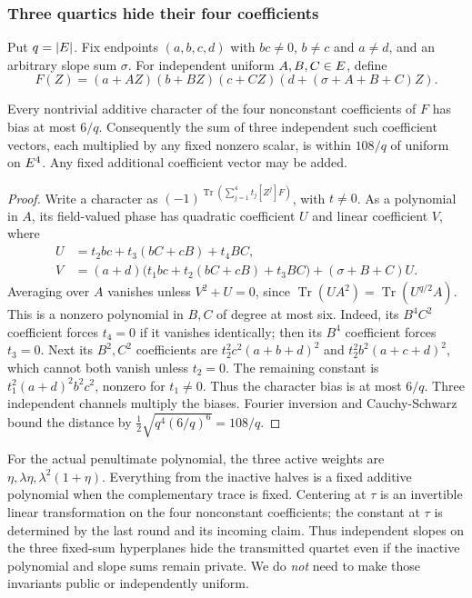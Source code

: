 \subsubsection{Three quartics hide their four coefficients}

Put $q=|E|$. Fix endpoints $(a,b,c,d)$ with $bc\ne0$, $b\ne c$ and $a\ne d$, and an arbitrary slope sum $\sigma$. For independent uniform $A,B,C\in E$, define
\[
 F(Z)=(a+AZ)(b+BZ)(c+CZ)(d+(\sigma+A+B+C)Z).
\]

\begin{lemma}
Every nontrivial additive character of the four nonconstant coefficients of $F$ has bias at most $6/q$. Consequently the sum of three independent such coefficient vectors, each multiplied by any fixed nonzero scalar, is within $108/q$ of uniform on $E^4$. Any fixed additional coefficient vector may be added.
\end{lemma}
\begin{proof}
Write a character as $(-1)^{\operatorname{Tr}(\sum_{j=1}^4t_j[Z^j]F)}$, with $t\ne0$. As a polynomial in $A$, its field-valued phase has quadratic coefficient $U$ and linear coefficient $V$, where
\[
\begin{aligned}
 U&=t_2bc+t_3(bC+cB)+t_4BC,\\
 V&=(a+d)\bigl(t_1bc+t_2(bC+cB)+t_3BC\bigr)
       +(\sigma+B+C)U.
\end{aligned}
\]
Averaging over $A$ vanishes unless $V^2+U=0$, since $\operatorname{Tr}(UA^2)=\operatorname{Tr}(U^{q/2}A)$. This is a nonzero polynomial in $B,C$ of degree at most six. Indeed, its $B^4C^2$ coefficient forces $t_4=0$ if it vanishes identically; then its $B^4$ coefficient forces $t_3=0$. Next its $B^2,C^2$ coefficients are $t_2^2c^2(a+b+d)^2$ and $t_2^2b^2(a+c+d)^2$, which cannot both vanish unless $t_2=0$. The remaining constant is $t_1^2(a+d)^2b^2c^2$, nonzero for $t_1\ne0$. Thus the character bias is at most $6/q$. Three independent channels multiply the biases. Fourier inversion and Cauchy-Schwarz bound the distance by $\tfrac12\sqrt{q^4(6/q)^6}=108/q$.
\end{proof}

For the actual penultimate polynomial, the three active weights are $\eta,\lambda\eta,\lambda^2(1+\eta)$. Everything from the inactive halves is a fixed additive polynomial when the complementary trace is fixed. Centering at $\tau$ is an invertible linear transformation on the four nonconstant coefficients; the constant at $\tau$ is determined by the last round and its incoming claim. Thus independent slopes on the three fixed-sum hyperplanes hide the transmitted quartet even if the inactive polynomial and slope sums remain private. We do \emph{not} need to make those invariants public or independently uniform.


